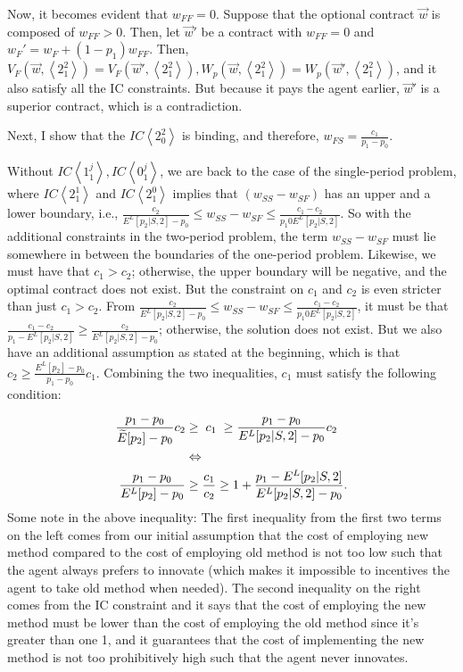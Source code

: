 \documentclass[11pt]{article} %
\theoremstyle{exampstyle}
\newcommand{\eq}[1]{\begin{align}#1\end{align}}
\newcommand{\la}{ \left < }
\newcommand{\ra}{ \right > }
\newcommand{\wtE}{ \widetilde{E}}
\begin{document}
Now, it becomes evident that $w_{FF}=0$. Suppose that the optional contract $\vec{w}$ is composed of $w_{FF}>0$. Then, let $\vec{w}'$ be a contract with $w_{FF}=0$ and $w_{F}'=w_F + (1-p_1)w_{FF}$. Then, $V_F(\vec{w},\la 2^2_1\ra)= V_F(\vec{w}',\la 2^2_1\ra), W_p(\vec{w}, \la 2^2_1\ra) = W_p(\vec{w}', \la 2^2_1\ra)$, and it also satisfy all the IC constraints. But because it pays the agent earlier, $\vec{w}'$ is a superior contract, which is a contradiction.


Next, I show that the $IC \la 2^2_0 \ra$ is binding, and therefore, $w_{FS} = \frac{c_1}{p_1-p_0}$.

Without $IC \la 1^j_1 \ra, IC \la 0^j_1 \ra$, we are back to the case of the single-period problem, where $IC \la 2^1_1 \ra$ and $IC \la 2^0_1 \ra$ implies that $(w_{SS}-w_{SF})$ has an upper and a lower boundary, i.e., $\frac{c_2}{E^L[p_2|S,2]-p_0} \le w_{SS}-w_{SF} \le \frac{c_1-c_2}{p_1 0 E^L[p_2|S,2]}$. So with the additional constraints in the two-period problem, the term $w_{SS} - w_{SF}$ must lie somewhere in between the boundaries of the one-period problem. Likewise, we must have that $c_1>c_2$; otherwise, the upper boundary will be negative, and the optimal contract does not exist. But the constraint on $c_1$ and $c_2$ is even stricter than just $c_1>c_2$. From $\frac{c_2}{E^L[p_2|S,2]-p_0} \le w_{SS}-w_{SF} \le \frac{c_1-c_2}{p_1 0 E^L[p_2|S,2]}$, it must be that  $ \frac{c_1-c_2}{p_1 - E^L[p_2|S,2]} \ge \frac{c_2}{E^L[p_2|S,2]-p_0}$; otherwise, the solution does not exist. But we also have an additional assumption as stated at the beginning, which is that $c_2 \ge \frac{E^L[p_2]-p_0}{p_1 -p_0} c_1 $. Combining the two inequalities, $c_1$ must satisfy the following condition:

\eq{ 
\frac{p_1-p_0}{\wtE[p_2]-p_0}c_2 &\ge \; c_1 \; \ge   \frac{p_1-p_0}{E^L[p_2|S,2]-p_0} c_2 \notag \\
 &\Leftrightarrow \notag \\
\frac{p_1 -p_0}{E^L[p_2]-p_0}  &\ge  \frac{c_1}{c_2} \ge 1+ \frac{p_1 -E^L[p_2|S,2]}{E^L[p_2|S,2] - p_0} . \notag 
}
Some note in the above inequality: The first inequality from the first two terms on the left comes from our initial assumption that the cost of employing new method compared to the cost of employing old method is not too low such that the agent always prefers to innovate (which makes it impossible to incentives the agent to take old method when needed).  The second inequality on the right comes from the IC constraint and it says that the cost of employing the new method must be lower than the cost of employing the old method since it's greater than one 1, and it guarantees that the cost of implementing the new method is not too prohibitively high such that the agent never innovates. 
\end{document}
